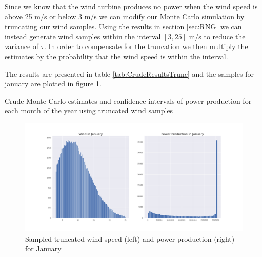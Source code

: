 \documentclass[a4paper]{article}
\begin{document}
Since we know that the wind turbine produces no power when the wind speed is above 25 m/s or below 3 m/s we can modify our Monte Carlo simulation by truncating our wind samples. Using the results in section \ref{sec:RNG} we can instead generate wind samples within the interval $[3,25]$ m/s to reduce the variance of $\tau$. In order to compensate for the truncation we then multiply the estimates by the probability that the wind speed is within the interval.

The results are presented in table \ref{tab:CrudeResultsTrunc} and the samples for january are plotted in figure \ref{fig:samplesJanTrunc}.
\begin{table}[H]
    \centering
    
    \caption{Crude Monte Carlo estimates and confidence intervals of power production for each month of the year using truncated wind samples}
    \label{tab:CrudeResultsTrunc}
\end{table}

\begin{figure}[H]
    \centering
    \includegraphics[width = 1.0\textwidth]{images/janCrudeMCTrunc}
    \caption{Sampled truncated wind speed (left) and power production (right) for January}
    \label{fig:samplesJanTrunc}
\end{figure}
\end{document}
